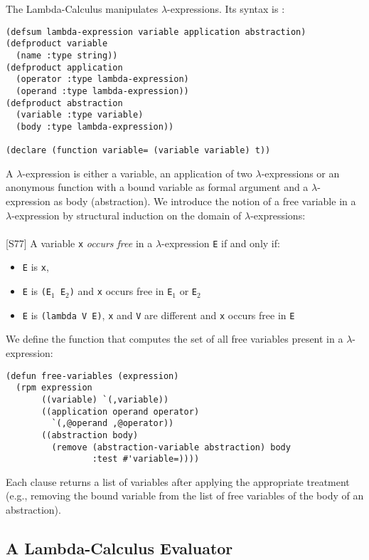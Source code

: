 \documentclass[a4paper,11pt]{article}
\begin{document}
The Lambda-Calculus manipulates $\lambda$-expressions. Its syntax is : 
\begin{verbatim}
(defsum lambda-expression variable application abstraction)
(defproduct variable
  (name :type string))
(defproduct application
  (operator :type lambda-expression)
  (operand :type lambda-expression))
(defproduct abstraction
  (variable :type variable)
  (body :type lambda-expression))

(declare (function variable= (variable variable) t))
\end{verbatim}
A $\lambda$-expression is either a variable, an application of two
$\lambda$-expressions or an anonymous function with a
bound variable as formal argument and a $\lambda$-expression as body
(abstraction). 
We introduce the notion of a free variable in a $\lambda$-expression
by structural induction on the domain of $\lambda$-expressions:
{~~~~~}\\
~~~~~\\
 [S77] A variable \texttt{x} \emph{occurs free} in a
$\lambda$-expression \texttt{E} if and only if:
\begin{itemize}
\item \texttt{E} is \texttt{x},
\item \texttt{E} is \texttt{(E${}_1$ E${}_2$)} and \texttt{x} occurs free in
\texttt{E${}_1$} or \texttt{E${}_2$}
\item \texttt{E} is \texttt{(lambda V E)}, \texttt{x} and \texttt{V} are
different and \texttt{x} occurs free in \texttt{E}
\end{itemize}

\noindent We define the function that computes the set of all free
variables present in a $\lambda$-expression:
\begin{verbatim}
(defun free-variables (expression)
  (rpm expression
       ((variable) `(,variable))
       ((application operand operator)
         `(,@operand ,@operator))
       ((abstraction body)
         (remove (abstraction-variable abstraction) body
                 :test #'variable=))))
\end{verbatim}
Each clause returns a list of variables after applying the
appropriate treatment (e.g., removing the bound variable from the list
of free variables of the body of an abstraction). 

\subsection{A Lambda-Calculus Evaluator}
\end{document}
